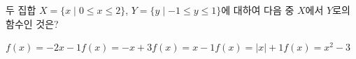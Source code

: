 두 집합 $X=\{x \mid 0\le x\le 2\}$, $Y=\{y \mid -1\le y\le 1\}$에 대하여 다음 중 $X$에서 $Y$로의 함수인 것은?
\begin{choicesii}{$f(x)=-2x-1$}{$f(x)=-x+3$}{$f(x)=x-1$}{$f(x)=|x|+1$}{$f(x)=x^2-3$}\end{choicesii}
